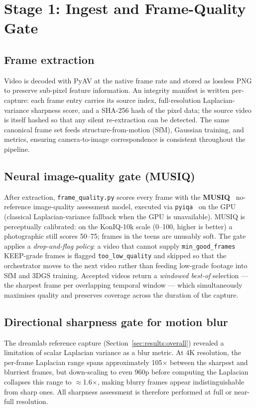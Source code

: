 \section{Stage 1: Ingest and Frame-Quality Gate}
\label{sec:method:ingest}

\subsection{Frame extraction}
Video is decoded with PyAV at the native frame rate and stored as lossless PNG to preserve
sub-pixel feature information.  An integrity manifest is written per-capture: each frame
entry carries its source index, full-resolution Laplacian-variance sharpness score, and a
SHA-256 hash of the pixel data; the source video is itself hashed so that any silent
re-extraction can be detected.  The same canonical frame set feeds structure-from-motion
(SfM), Gaussian training, and metrics, ensuring camera-to-image correspondence is
consistent throughout the pipeline.

\subsection{Neural image-quality gate (MUSIQ)}
After extraction, \texttt{frame\_quality.py} scores every frame with the
\textbf{MUSIQ}~\cite{ke2021_musiq} no-reference image-quality assessment model, executed
via \texttt{pyiqa}~\cite{chen2022_pyiqa} on the GPU (classical Laplacian-variance fallback
when the GPU is unavailable).  MUSIQ is perceptually calibrated: on the KonIQ-10k scale
(0--100, higher is better) a photographic still scores 50--75; frames in the teens are
unusably soft.  The gate applies a \emph{drop-and-flag policy}: a video that cannot
supply \texttt{min\_good\_frames} KEEP-grade frames is flagged \texttt{too\_low\_quality}
and skipped so that the orchestrator moves to the next video rather than feeding low-grade
footage into SfM and 3DGS training.  Accepted videos return a \emph{windowed best-of}
selection --- the sharpest frame per overlapping temporal window --- which simultaneously
maximises quality and preserves coverage across the duration of the capture.

\subsection{Directional sharpness gate for motion blur}
\label{sec:method:directional}
The dreamlab reference capture (Section~\ref{sec:results:overall}) revealed a limitation
of scalar Laplacian variance as a blur metric.  At 4K resolution, the per-frame Laplacian
range spans approximately 105$\times$ between the sharpest and blurriest frames, but
down-scaling to even 960p before computing the Laplacian collapses this range to
$\approx$1.6$\times$, making blurry frames appear indistinguishable from sharp ones.
All sharpness assessment is therefore performed at full or near-full resolution.

